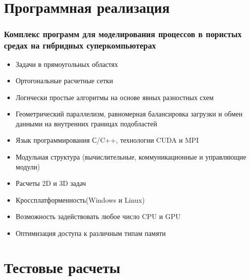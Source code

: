 \documentclass[10pt,pdf,hyperref={unicode}]{beamer} %
\begin{document}
\section{Программная реализация}

\begin{frame}
\begin{center}
\frametitle{Комплекс программ для моделирования процессов в пористых средах на гибридных суперкомпьютерах}
\begin{itemize}
\item Задачи в прямоугольных областях
\item Ортогональные расчетные сетки
\item Логически простые алгоритмы на основе явных разностных схем
\item Геометрический параллелизм, равномерная балансировка загрузки и обмен данными на внутренних границах подобластей
\item Язык программирования С/C++, технологии CUDA и MPI
\item Модульная структура (вычислительные, коммуникационные и управляющие модули)
\item Расчеты 2D и 3D задач
\item Кроссплатформенность(Windows и Linux)
\item Возможность задействовать любое число CPU и GPU
\item Оптимизация доступа к различным типам памяти
\end{itemize}
\end{center}
\end{frame}

\section{Тестовые расчеты}
\end{document}
